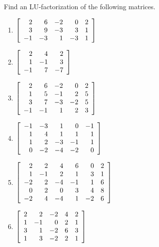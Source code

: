 \begin{multicols}{2}
\begin{ex}
Find an LU-factorization of the following matrices.

\begin{enumerate}[label={\alph*.}]
\item $\left[ \begin{array}{rrrrr}
2 & 6 & -2 & 0 & 2 \\
3 & 9 & -3 & 3 & 1 \\
-1 & -3 & 1 & -3 & 1
\end{array} \right]$

\item $\left[ \begin{array}{rrr}
2 & 4 & 2 \\
1 & -1 & 3 \\
-1 & 7 & -7
\end{array} \right]$

\item $\left[ \begin{array}{rrrrr}
2 & 6 & -2 & 0 & 2 \\
1 & 5 & -1 & 2 & 5 \\
3 & 7 & -3 & -2 & 5 \\
-1 & -1 & 1 & 2 & 3 
\end{array} \right]$

\item $\left[ \begin{array}{rrrrr}
-1 & -3 & 1 & 0 & -1 \\
1 & 4 & 1 & 1 & 1 \\
1 & 2 & -3 & -1 & 1 \\
0 & -2 & -4 & -2 & 0 
\end{array} \right]$

\item $\left[ \begin{array}{rrrrrr}
2 & 2 & 4 & 6 & 0 & 2 \\
1 & -1 & 2 & 1 & 3 & 1 \\
-2 & 2 & -4 & -1 & 1 & 6 \\
0 & 2 & 0 & 3 & 4 & 8 \\
-2 & 4 & -4 & 1 & -2 & 6 
\end{array} \right]$

\item $\left[ \begin{array}{rrrrr}
2 & 2 & -2 & 4 & 2 \\
1 & -1 & 0 & 2 & 1 \\
3 & 1 & -2 & 6 & 3 \\
1 & 3 & -2 & 2 & 1 
\end{array} \right]$


\end{enumerate}
\end{ex}
\end{multicols}
